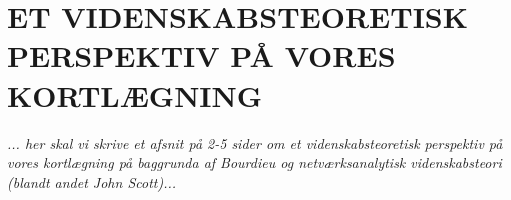 








\section{ET VIDENSKABSTEORETISK PERSPEKTIV PÅ VORES KORTLÆGNING \label{}}

\emph{... her skal vi skrive et afsnit på 2-5 sider om et videnskabsteoretisk perspektiv på vores kortlægning på baggrunda af Bourdieu og netværksanalytisk videnskabsteori (blandt andet John Scott)...} %






